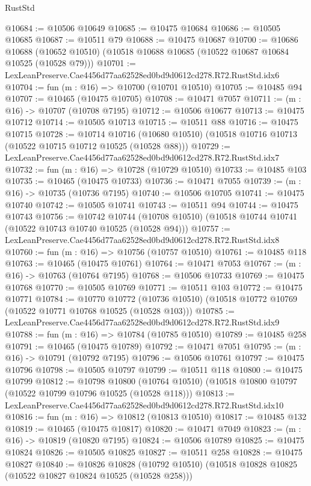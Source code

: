 \begin{lexlean}{RustStd}
\begin{coremodule}
@10684 := @10506 @10649
@10685 := @10475 @10684
@10686 := @10505 @10685
@10687 := @10511 @79
@10688 := @10475 @10687
@10700 := @10686
    @10688
    (@10652 @10510)
    (@10518 @10688 @10685 (@10522 @10687 @10684 @10525 (@10528 @79)))
@10701 := LexLeanPreserve.Cae4456d77aa62528ed0bd9d0612cd278.R72.RustStd.idx6
@10704 := fun (m : @16) => @10700 (@10701 @10510)
@10705 := @10485 @94
@10707 := @10465 (@10475 @10705)
@10708 := @10471 @7057
@10711 := (m : @16) -> @10707 (@10708 @7195)
@10712 := @10506 @10677
@10713 := @10475 @10712
@10714 := @10505 @10713
@10715 := @10511 @88
@10716 := @10475 @10715
@10728 := @10714
    @10716
    (@10680 @10510)
    (@10518 @10716 @10713 (@10522 @10715 @10712 @10525 (@10528 @88)))
@10729 := LexLeanPreserve.Cae4456d77aa62528ed0bd9d0612cd278.R72.RustStd.idx7
@10732 := fun (m : @16) => @10728 (@10729 @10510)
@10733 := @10485 @103
@10735 := @10465 (@10475 @10733)
@10736 := @10471 @7055
@10739 := (m : @16) -> @10735 (@10736 @7195)
@10740 := @10506 @10705
@10741 := @10475 @10740
@10742 := @10505 @10741
@10743 := @10511 @94
@10744 := @10475 @10743
@10756 := @10742
    @10744
    (@10708 @10510)
    (@10518 @10744 @10741 (@10522 @10743 @10740 @10525 (@10528 @94)))
@10757 := LexLeanPreserve.Cae4456d77aa62528ed0bd9d0612cd278.R72.RustStd.idx8
@10760 := fun (m : @16) => @10756 (@10757 @10510)
@10761 := @10485 @118
@10763 := @10465 (@10475 @10761)
@10764 := @10471 @7053
@10767 := (m : @16) -> @10763 (@10764 @7195)
@10768 := @10506 @10733
@10769 := @10475 @10768
@10770 := @10505 @10769
@10771 := @10511 @103
@10772 := @10475 @10771
@10784 := @10770
    @10772
    (@10736 @10510)
    (@10518 @10772 @10769 (@10522 @10771 @10768 @10525 (@10528 @103)))
@10785 := LexLeanPreserve.Cae4456d77aa62528ed0bd9d0612cd278.R72.RustStd.idx9
@10788 := fun (m : @16) => @10784 (@10785 @10510)
@10789 := @10485 @258
@10791 := @10465 (@10475 @10789)
@10792 := @10471 @7051
@10795 := (m : @16) -> @10791 (@10792 @7195)
@10796 := @10506 @10761
@10797 := @10475 @10796
@10798 := @10505 @10797
@10799 := @10511 @118
@10800 := @10475 @10799
@10812 := @10798
    @10800
    (@10764 @10510)
    (@10518 @10800 @10797 (@10522 @10799 @10796 @10525 (@10528 @118)))
@10813 := LexLeanPreserve.Cae4456d77aa62528ed0bd9d0612cd278.R72.RustStd.idx10
@10816 := fun (m : @16) => @10812 (@10813 @10510)
@10817 := @10485 @132
@10819 := @10465 (@10475 @10817)
@10820 := @10471 @7049
@10823 := (m : @16) -> @10819 (@10820 @7195)
@10824 := @10506 @10789
@10825 := @10475 @10824
@10826 := @10505 @10825
@10827 := @10511 @258
@10828 := @10475 @10827
@10840 := @10826
    @10828
    (@10792 @10510)
    (@10518 @10828 @10825 (@10522 @10827 @10824 @10525 (@10528 @258)))

\end{coremodule}
\end{lexlean}
